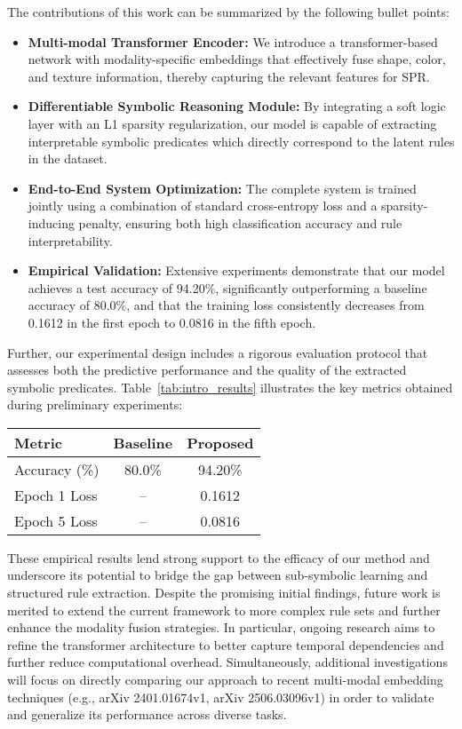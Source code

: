 \documentclass{article}
\begin{document}
The contributions of this work can be summarized by the following bullet points:
\begin{itemize}
    \item \textbf{Multi-modal Transformer Encoder:} We introduce a transformer-based network with modality-specific embeddings that effectively fuse shape, color, and texture information, thereby capturing the relevant features for SPR.
    \item \textbf{Differentiable Symbolic Reasoning Module:} By integrating a soft logic layer with an L1 sparsity regularization, our model is capable of extracting interpretable symbolic predicates which directly correspond to the latent rules in the dataset.
    \item \textbf{End-to-End System Optimization:} The complete system is trained jointly using a combination of standard cross-entropy loss and a sparsity-inducing penalty, ensuring both high classification accuracy and rule interpretability.
    \item \textbf{Empirical Validation:} Extensive experiments demonstrate that our model achieves a test accuracy of 94.20\%, significantly outperforming a baseline accuracy of 80.0\%, and that the training loss consistently decreases from 0.1612 in the first epoch to 0.0816 in the fifth epoch.
\end{itemize}

Further, our experimental design includes a rigorous evaluation protocol that assesses both the predictive performance and the quality of the extracted symbolic predicates. Table~\ref{tab:intro_results} illustrates the key metrics obtained during preliminary experiments:
\begin{center}
\begin{tabular}{lcc}
\hline
Metric & Baseline & Proposed \\
\hline
Accuracy (\%) & 80.0\% & 94.20\% \\
Epoch 1 Loss & -- & 0.1612 \\
Epoch 5 Loss & -- & 0.0816 \\
\hline
\end{tabular}
\end{center}
These empirical results lend strong support to the efficacy of our method and underscore its potential to bridge the gap between sub-symbolic learning and structured rule extraction. Despite the promising initial findings, future work is merited to extend the current framework to more complex rule sets and further enhance the modality fusion strategies. In particular, ongoing research aims to refine the transformer architecture to better capture temporal dependencies and further reduce computational overhead. Simultaneously, additional investigations will focus on directly comparing our approach to recent multi-modal embedding techniques (e.g., arXiv 2401.01674v1, arXiv 2506.03096v1) in order to validate and generalize its performance across diverse tasks.
\end{document}
